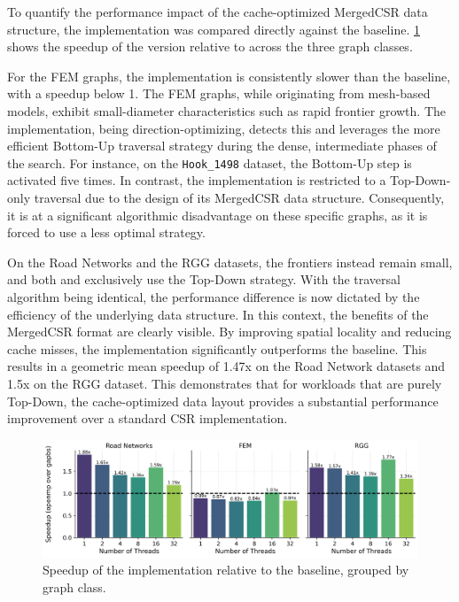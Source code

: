 To quantify the performance impact of the cache-optimized MergedCSR data structure, the \openmp{} implementation was compared directly against the \gapbs{} baseline. \cref{fig:speedup_openmp} shows the speedup of the \openmp{} version relative to \gapbs{} across the three graph classes.

For the FEM graphs, the \openmp{} implementation is consistently slower than the \gapbs{} baseline, with a speedup below 1. The FEM graphs, while originating from mesh-based models, exhibit small-diameter characteristics such as rapid frontier growth. The \gapbs{} implementation, being direction-optimizing, detects this and leverages the more efficient Bottom-Up traversal strategy during the dense, intermediate phases of the search. For instance, on the \texttt{Hook\_1498} dataset, the Bottom-Up step is activated five times. In contrast, the \openmp{} implementation is restricted to a Top-Down-only traversal due to the design of its MergedCSR data structure. Consequently, it is at a significant algorithmic disadvantage on these specific graphs, as it is forced to use a less optimal strategy.

On the Road Networks and the RGG datasets, the frontiers instead remain small, and both \gapbs{} and \openmp{} exclusively use the Top-Down strategy. With the traversal algorithm being identical, the performance difference is now dictated by the efficiency of the underlying data structure. In this context, the benefits of the MergedCSR format are clearly visible. By improving spatial locality and reducing cache misses, the \openmp{} implementation significantly outperforms the baseline. This results in a geometric mean speedup of 1.47x on the Road Network datasets and 1.5x on the RGG dataset. This demonstrates that for workloads that are purely Top-Down, the cache-optimized data layout provides a substantial performance improvement over a standard CSR implementation.

\begin{figure}[h!]
\centering
\includegraphics[width=\linewidth]{images/speedup_openmp.png}
\caption{Speedup of the \openmp{} implementation relative to the \gapbs{} baseline, grouped by graph class.}
\label{fig:speedup_openmp}
\end{figure}

